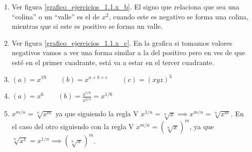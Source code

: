 \begin{ejercicio}
\begin{enumerate}
        La diferencia entre \(a\) y \(c\) se encuentra en la ordenada de origen, ya que su pendiente es la misma \((2x)\), en \(a\) la ordenada es \(16\) y en \(c\) la ordenada es \(12\). Esto se ve en el punto donde \(x\) intersecta con el eje \(y\).
        \item Ver figura \ref{grafico_ejercicios_1.1.x_b}. El signo que relaciona que sea una ``colina'' o un ``valle'' es el de \(x^2\), cuando este es negativo se forma una colina, mientras que si este es positivo se forma un valle. 
        \item Ver figura \ref{grafico_ejercicios_1.1.x_c}. En la grafica si tomamos valores negativos vamos a ver una forma similar a la del positivo pero en ves de que esté en el primer cuadrante, está va a estar en el tercer cuadrante.
        \item \((a) = x^{19} \qquad (b) = x^{a+b+c} \qquad (c)= (xyz)^3\)
        \item \((a) = x^6 \qquad (b)=\frac{x^{5/6}}{x^{2/3}}= x^{1/6}\)
        \item \(x^{m/n} = \sqrt[n]{x^m}\) ya que siguiendo la regla V \(x^{1/n} = \sqrt[n]{x} \implies x^{m/n}= \sqrt[n]{x^m}\). En el caso del otro siguiendo con la regla V \(x^{m/n}=(\sqrt[n]{x})^m\), ya que \(\sqrt[n]{x^1} = x^{1/n} \implies (\sqrt[n]{x})^m\).
    \end{enumerate}
\end{ejercicio}


